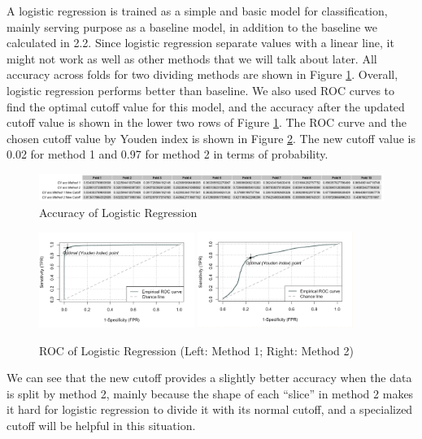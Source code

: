 \documentclass[11pt]{article}
\begin{document}
A logistic regression is trained as a simple and basic model for classification, mainly serving purpose as a baseline model, in addition to the baseline we calculated in 2.2. Since logistic regression separate values with a linear line, it might not work as well as other methods that we will talk about later. All accuracy across folds for two dividing methods are shown in Figure \ref{fig:3-1-1}. Overall, logistic regression performs better than baseline. We also used ROC curves to find the optimal cutoff value for this model, and the accuracy after the updated cutoff value is shown in the lower two rows of Figure \ref{fig:3-1-1}. The ROC curve and the chosen cutoff value by Youden index is shown in Figure \ref{fig:3-1-2}. The new cutoff value is 0.02 for method 1 and 0.97 for method 2 in terms of probability.

\begin{figure}[h]
\includegraphics[width=\textwidth]{3-1-1.png}
\centering
\caption{Accuracy of Logistic Regression}
\label{fig:3-1-1}
\centering
\end{figure}

\begin{figure}[h]
\includegraphics[width=0.45\textwidth]{log_1.jpeg}
\includegraphics[width=0.45\textwidth]{log_2.jpeg}
\centering
\caption{ROC of Logistic Regression (Left: Method 1; Right: Method 2)}
\label{fig:3-1-2}
\centering
\end{figure}

We can see that the new cutoff provides a slightly better accuracy when the data is split by method 2, mainly because the shape of each ``slice'' in method 2 makes it hard for logistic regression to divide it with its normal cutoff, and a specialized cutoff will be helpful in this situation. 
\end{document}
